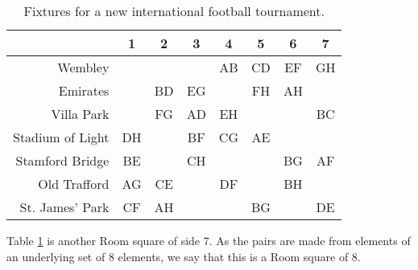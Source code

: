 \begin{table}[h!]
  \begin{center}
    \begin{tabular}{r|ccccccc}
                       & 1  &  2 &  3 &  4 &  5 &  6 &  7 \\ \hline
               Wembley &    &    &    & AB & CD & EF & GH \\
              Emirates &    & BD & EG &    & FH & AH &    \\
            Villa Park &    & FG & AD & EH &    &    & BC \\
      Stadium of Light & DH &    & BF & CG & AE &    &    \\
       Stamford Bridge & BE &    & CH &    &    & BG & AF \\
          Old Trafford & AG & CE &    & DF &    & BH &    \\
       St. James' Park & CF & AH &    &    & BG &    & DE
    \end{tabular}
  \end{center}
  \caption{Fixtures for a new international football tournament.}
  \label{tab:fixtures}
\end{table}

Table \ref{tab:fixtures} is another Room square of side 7.
As the pairs are made from elements of an underlying set of 8 elements, we say that this is a Room square of  8.
